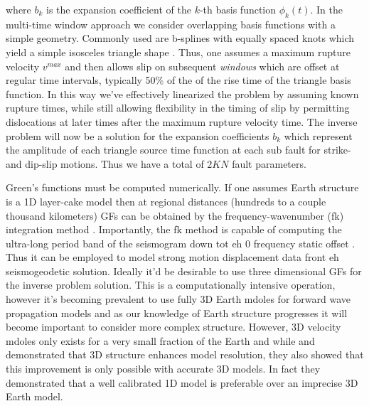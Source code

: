 where $b_k$ is the expansion coefficient of the $k$-th basis function $\phi_k(t)$. In the multi-time window approach we consider overlapping basis functions with a simple geometry. Commonly used are b-splines with equally spaced knots which yield a simple isosceles triangle shape \citet{ide1996,wu2001}. 
Thus, one assumes a maximum rupture velocity $v^{max}$ and then allows slip on subsequent \textit{windows}  which are offset at regular time intervals, typically 50\% of the of the rise time of the triangle basis function. In this way we've effectively linearized the problem by assuming known rupture times, while still allowing flexibility in the timing of slip by permitting dislocations at later times after the maximum rupture velocity time. The inverse problem will now be a solution for the expansion coefficients $b_k$ which represent the amplitude of each triangle source time function at each sub fault for strike- and dip-slip motions. Thus we have a total of $2KN$ fault parameters.

Green's functions must be computed numerically. If one assumes Earth structure is a 1D layer-cake model then at regional distances (hundreds to a couple thousand kilometers) GFs can be obtained by the frequency-wavenumber (fk) integration method \citep{saikia1994}. Importantly, the fk method is capable of computing the ultra-long period band of the seismogram down tot eh 0 frequency static offset \citep{zhu2002}. Thus it can be employed to model strong motion displacement data front eh seismogeodetic solution. Ideally it'd be desirable to use three dimensional GFs for the inverse problem solution. This is a computationally intensive operation, however it's becoming prevalent to use fully 3D Earth mdoles for forward wave propagation models \citep{bielak2010,tromp2010} and as our knowledge of Earth structure progresses it will become important to consider more complex structure. However, 3D velocity mdoles only exists for a very small fraction of the Earth and while \citet{graves2001} and \citet{wald2001} demonstrated that 3D structure enhances model resolution, they also showed that this improvement is only possible with accurate 3D models. In fact they demonstrated that a well calibrated 1D model is preferable over an imprecise 3D Earth model.

